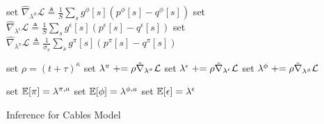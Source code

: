 \begin{algorithm}
{  
  set $\hat\nabla_{\lambda^{\phi} }\mathcal{L} \triangleq \frac{1}{S} \sum_s g^\phi[s] ( p^\phi[s] -  q^\phi[s] )$ \;
  set $\hat\nabla_{\lambda^{\epsilon}} \mathcal{L} \triangleq \frac{1}{S} \sum_s g^\epsilon[s] ( p^\epsilon[s] -  q^\epsilon[s] )$ \;
  set $\hat\nabla_{\lambda^{\pi}} \mathcal{L} \triangleq \frac{1}{\sigma_\pi} \sum_s g^\pi[s] ( p^\pi[s] -  q^\pi[s] )$ \;

  \BlankLine
  set $\rho= (t +\tau)^\kappa$ \;
  set $\lambda^{\pi} \mathrel{+}= \rho \hat\nabla_{\lambda^{\pi}} \mathcal{L}$ \;
  set $\lambda^{\epsilon} \mathrel{+}= \rho \hat\nabla_{\lambda^{\epsilon}} \mathcal{L}$ \;
  set $\lambda^{\phi} \mathrel{+}= \rho \hat\nabla_{\lambda^{\phi}} \mathcal{L}$ \;
}

set $\mathbb{E}[\pi] = \lambda^{\pi,a}$ \;
set $\mathbb{E}[\phi] = \lambda^{\phi,a}$ \;
set $\mathbb{E}[\epsilon] = \lambda^{\epsilon}$ \;
\BlankLine
\Return{$\E[\pi]$, $\E[\phi]$, $\E[\epsilon]$} \;
\caption{Inference for Cables Model}
\label{alg:cables}
\end{algorithm}